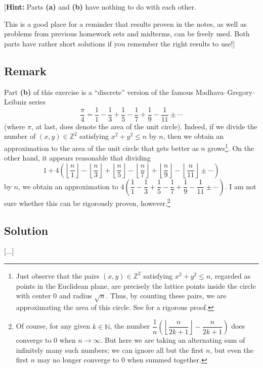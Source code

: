 \documentclass[paper=a4, fontsize=12pt]{scrartcl} %
\newcommand{\NN}{\mathbb{N}} %
\newcommand{\ZZ}{\mathbb{Z}} %
\newcommand{\tup}[1]{\left( #1 \right)}
\newcommand{\floor}[1]{\left\lfloor #1 \right\rfloor}
\theoremstyle{plainsl}
\theoremstyle{definition}
\theoremstyle{remark}
\begin{document}
[\textbf{Hint:} Parts \textbf{(a)} and \textbf{(b)} have nothing to do with
each other.

This is a good place for a reminder that results proven in the notes, as well
as problems from previous homework sets and midterms, can be freely used. Both
parts have rather short solutions if you remember the right results to use!]

\subsection{Remark}

Part \textbf{(b)} of this exercise is a ``discrete'' version of the
famous Madhava--Gregory--Leibniz series
\[
\dfrac{\pi}{4}
= \dfrac{1}{1} - \dfrac{1}{3} + \dfrac{1}{5} - \dfrac{1}{7}
  + \dfrac{1}{9} - \dfrac{1}{11} \pm \cdots
\]
(where $\pi$, at last, does denote the area of the unit circle).
Indeed, if we divide the number of $\tup{x, y} \in \ZZ^2$ satisfying
$x^2 + y^2 \leq n$ by $n$, then we obtain an approximation to
the area of the unit circle that gets better as $n$
grows\footnote{Just observe that the pairs
$\tup{x, y} \in \ZZ^2$ satisfying $x^2 + y^2 \leq n$, regarded
as points in the Euclidean plane, are precisely the lattice points
inside the circle with center $0$ and radius $\sqrt{n}$.
Thus, by counting these pairs, we are approximating the area of this
circle. See \cite[Theorem 12.1]{Clark18} for a rigorous proof.}.
On the other hand, it appears reasonable that dividing
\[
1 + 4 \tup{   \floor{\dfrac{n}{1}} - \floor{\dfrac{n}{3}} 
                + \floor{\dfrac{n}{5}} - \floor{\dfrac{n}{7}}
                + \floor{\dfrac{n}{9}} - \floor{\dfrac{n}{11}}
                \pm \cdots }
\]
by $n$, we obtain an approximation to
$4 \tup{\dfrac{1}{1} - \dfrac{1}{3} + \dfrac{1}{5} - \dfrac{1}{7}
        + \dfrac{1}{9} - \dfrac{1}{11} \pm \cdots}$.
I am not sure whether this can be rigorously proven,
however.\footnote{Of course, for any given $k \in \NN$,
the number
$\dfrac{1}{n}\tup{\floor{\dfrac{n}{2k+1}} - \dfrac{n}{2k+1}}$
does converge to $0$ when $n \to \infty$.
But here we are taking an alternating sum of infinitely many
such numbers; we can ignore all but the first $n$, but even
the first $n$ may no longer converge to $0$ when summed
together.}

\subsection{Solution}

[...]
\end{document}

